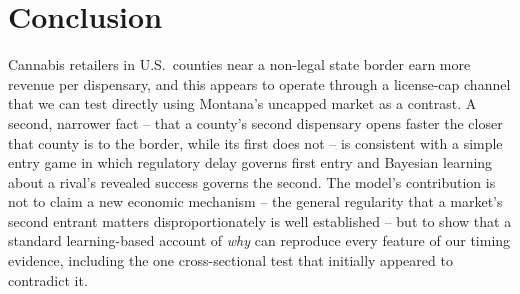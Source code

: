 \documentclass[12pt]{article}
\begin{document}
\section{Conclusion}

Cannabis retailers in U.S.\ counties near a non-legal state border earn more revenue per dispensary, and this
appears to operate through a license-cap channel that we can test directly using Montana's uncapped market as
a contrast. A second, narrower fact -- that a county's second dispensary opens faster the closer that county
is to the border, while its first does not -- is consistent with a simple entry game in which regulatory
delay governs first entry and Bayesian learning about a rival's revealed success governs the second. The
model's contribution is not to claim a new economic mechanism -- the general regularity that a market's
second entrant matters disproportionately is well established \citep{BresnahanReiss1990,BresnahanReiss1991}
-- but to show that a standard learning-based account of \emph{why} can reproduce every feature of our
timing evidence, including the one cross-sectional test that initially appeared to contradict it.

\newpage


\end{document}
